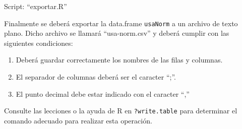 \documentclass[]{article}
\begin{document}
Script: ``exportar.R''

Finalmente se deberá exportar la data.frame \texttt{usaNorm} a un
archivo de texto plano. Dicho archivo se llamará ``usa-norm.csv'' y
deberá cumplir con las siguientes condiciones:

\begin{enumerate}[1.]
\item
  Deberá guardar correctamente los nombres de las filas y columnas.
\item
  El separador de columnas deberá ser el caracter ``;''.
\item
  El punto decimal debe estar indicado con el caracter ``,''
\end{enumerate}
Consulte las lecciones o la ayuda de R en \texttt{?write.table} para
determinar el comando adecuado para realizar esta operación.
\end{document}
